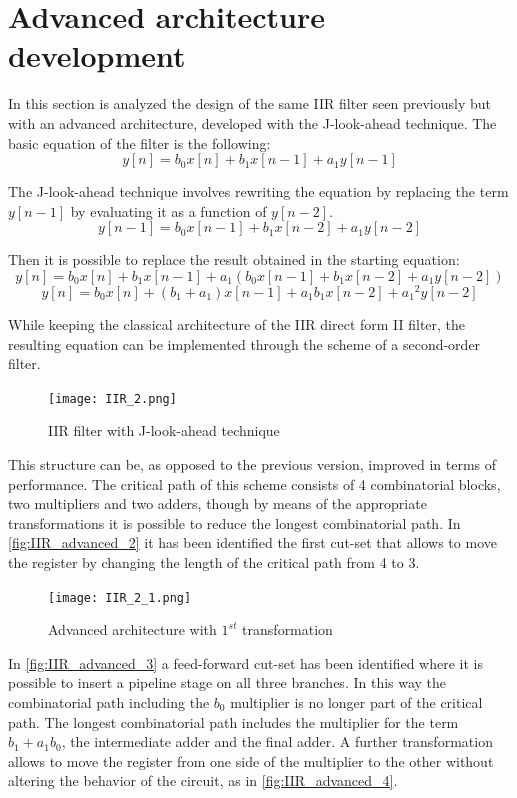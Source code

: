 \section{Advanced architecture development}
In this section is analyzed the design of the same IIR filter seen previously but with an advanced architecture, developed with the J-look-ahead technique. The basic equation of the filter is the following:
$$ y[n] = b_0x[n] + b_1x[n-1] + a_1y[n-1]$$

The J-look-ahead technique involves rewriting the equation by replacing the term $y[n-1]$ by evaluating it as a function of $y[n-2]$.
$$ y[n-1] = b_0x[n-1] + b_1x[n-2] + a_1y[n-2]$$

Then it is possible to replace the result obtained in the starting equation:
$$ y[n] = b_0x[n] + b_1x[n-1] + a_1(b_0x[n-1] + b_1x[n-2] + a_1y[n-2])$$
$$ y[n] = b_0x[n] + (b_1 + a_1)x[n-1] + a_1b_1x[n-2] + {a_1}^{2}y[n-2]$$

While keeping the classical architecture of the IIR direct form II filter, the resulting equation can be implemented through the scheme of a second-order filter.

\begin{figure}[h]
	\center
	\texttt{[image: IIR\_2.png]}
	\caption{IIR filter with J-look-ahead technique}
	\label{fig:IIR_advanced}
\end{figure}

This structure can be, as opposed to the previous version, improved in terms of performance. The critical path of this scheme consists of 4 combinatorial blocks, two multipliers and two adders, though by means of the appropriate transformations it is possible to reduce the longest combinatorial path.  In \autoref{fig:IIR_advanced_2} it has been identified the first cut-set that allows to move the register by changing the length of the critical path from 4 to 3.

\begin{figure}[htb]
	\center
	\texttt{[image: IIR\_2\_1.png]}
	\caption{Advanced architecture with $1^{st}$ transformation}
	\label{fig:IIR_advanced_2}
\end{figure}

In \autoref{fig:IIR_advanced_3} a feed-forward cut-set has been identified where it is possible to insert a pipeline stage on all three branches. In this way the combinatorial path including the $b_0$ multiplier is no longer part of the critical path. The longest combinatorial path includes the multiplier for the term $b_1 + a_1b_0$, the intermediate adder and the final adder. A further transformation allows to move the register from one side of the multiplier to the other without altering the behavior of the circuit, as in \autoref{fig:IIR_advanced_4}.

